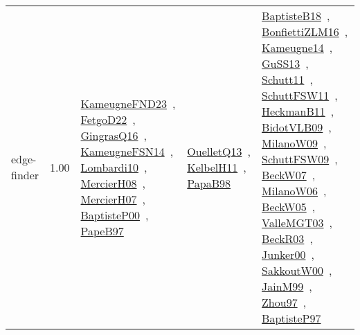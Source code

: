{\begin{longtable}{p{3cm}r>{\raggedright\arraybackslash}p{6cm}>{\raggedright\arraybackslash}p{6cm}>{\raggedright\arraybackslash}p{8cm}}
\index{edge-finder}\index{Algorithms!edge-finder}edge-finder &  1.00 & \href{../works/KameugneFND23.pdf}{KameugneFND23}~\cite{KameugneFND23}, \href{../works/FetgoD22.pdf}{FetgoD22}~\cite{FetgoD22}, \href{../works/GingrasQ16.pdf}{GingrasQ16}~\cite{GingrasQ16}, \href{../works/KameugneFSN14.pdf}{KameugneFSN14}~\cite{KameugneFSN14}, \href{../works/Lombardi10.pdf}{Lombardi10}~\cite{Lombardi10}, \href{../works/MercierH08.pdf}{MercierH08}~\cite{MercierH08}, \href{../works/MercierH07.pdf}{MercierH07}~\cite{MercierH07}, \href{../works/BaptisteP00.pdf}{BaptisteP00}~\cite{BaptisteP00}, \href{../works/PapeB97.pdf}{PapeB97}~\cite{PapeB97} & \href{../works/OuelletQ13.pdf}{OuelletQ13}~\cite{OuelletQ13}, \href{../works/KelbelH11.pdf}{KelbelH11}~\cite{KelbelH11}, \href{../works/PapaB98.pdf}{PapaB98}~\cite{PapaB98} & \href{../works/BaptisteB18.pdf}{BaptisteB18}~\cite{BaptisteB18}, \href{../works/BonfiettiZLM16.pdf}{BonfiettiZLM16}~\cite{BonfiettiZLM16}, \href{../works/Kameugne14.pdf}{Kameugne14}~\cite{Kameugne14}, \href{../works/GuSS13.pdf}{GuSS13}~\cite{GuSS13}, \href{../works/Schutt11.pdf}{Schutt11}~\cite{Schutt11}, \href{../works/SchuttFSW11.pdf}{SchuttFSW11}~\cite{SchuttFSW11}, \href{../works/HeckmanB11.pdf}{HeckmanB11}~\cite{HeckmanB11}, \href{../works/BidotVLB09.pdf}{BidotVLB09}~\cite{BidotVLB09}, \href{../works/MilanoW09.pdf}{MilanoW09}~\cite{MilanoW09}, \href{../works/SchuttFSW09.pdf}{SchuttFSW09}~\cite{SchuttFSW09}, \href{../works/BeckW07.pdf}{BeckW07}~\cite{BeckW07}, \href{../works/MilanoW06.pdf}{MilanoW06}~\cite{MilanoW06}, \href{../works/BeckW05.pdf}{BeckW05}~\cite{BeckW05}, \href{../works/ValleMGT03.pdf}{ValleMGT03}~\cite{ValleMGT03}, \href{../works/BeckR03.pdf}{BeckR03}~\cite{BeckR03}, \href{../works/Junker00.pdf}{Junker00}~\cite{Junker00}, \href{../works/SakkoutW00.pdf}{SakkoutW00}~\cite{SakkoutW00}, \href{../works/JainM99.pdf}{JainM99}~\cite{JainM99}, \href{../works/Zhou97.pdf}{Zhou97}~\cite{Zhou97}, \href{../works/BaptisteP97.pdf}{BaptisteP97}~\cite{BaptisteP97}\\

\end{longtable}}
